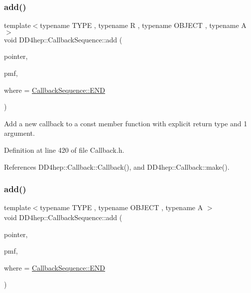 \subsubsection{\texorpdfstring{add()}{add()}\hspace{0.1cm}{\footnotesize\ttfamily [8/13]}}
{\footnotesize\ttfamily template$<$typename T\+Y\+PE , typename R , typename O\+B\+J\+E\+CT , typename A $>$ \\
void D\+D4hep\+::\+Callback\+Sequence\+::add (\begin{DoxyParamCaption}\item[{T\+Y\+PE $\ast$}]{pointer,  }\item[{R(O\+B\+J\+E\+C\+T\+::$\ast$)(A) const}]{pmf,  }\item[{\hyperlink{struct_d_d4hep_1_1_callback_sequence_a7753490247479633aed16a2376821ef7}{Location}}]{where = {\ttfamily \hyperlink{struct_d_d4hep_1_1_callback_sequence_a7753490247479633aed16a2376821ef7ac39eeb1bcfc1c235ab1d0d9315c310ac}{Callback\+Sequence\+::\+E\+ND}} }\end{DoxyParamCaption})\hspace{0.3cm}{\ttfamily [inline]}}



Add a new callback to a const member function with explicit return type and 1 argument. 



Definition at line 420 of file Callback.\+h.



References D\+D4hep\+::\+Callback\+::\+Callback(), and D\+D4hep\+::\+Callback\+::make().

\hypertarget{struct_d_d4hep_1_1_callback_sequence_a73f87e27f327c7dc8d51fa61b9019405}{}\label{struct_d_d4hep_1_1_callback_sequence_a73f87e27f327c7dc8d51fa61b9019405} 
\subsubsection{\texorpdfstring{add()}{add()}\hspace{0.1cm}{\footnotesize\ttfamily [9/13]}}
{\footnotesize\ttfamily template$<$typename T\+Y\+PE , typename O\+B\+J\+E\+CT , typename A $>$ \\
void D\+D4hep\+::\+Callback\+Sequence\+::add (\begin{DoxyParamCaption}\item[{T\+Y\+PE $\ast$}]{pointer,  }\item[{void(O\+B\+J\+E\+C\+T\+::$\ast$)(A) const}]{pmf,  }\item[{\hyperlink{struct_d_d4hep_1_1_callback_sequence_a7753490247479633aed16a2376821ef7}{Location}}]{where = {\ttfamily \hyperlink{struct_d_d4hep_1_1_callback_sequence_a7753490247479633aed16a2376821ef7ac39eeb1bcfc1c235ab1d0d9315c310ac}{Callback\+Sequence\+::\+E\+ND}} }\end{DoxyParamCaption})\hspace{0.3cm}{\ttfamily [inline]}}




